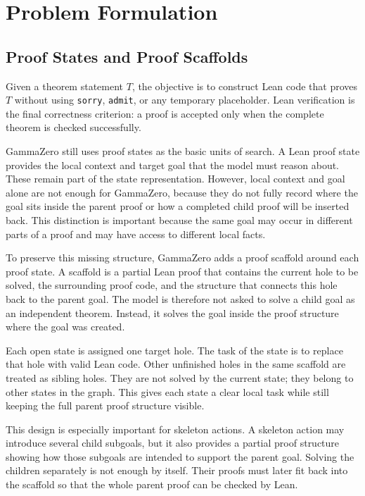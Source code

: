 \chapter{Problem Formulation}
\label{sec:problem-formulation}

\section{Proof States and Proof Scaffolds}

Given a theorem statement \(T\), the objective is to construct Lean code that proves \(T\) without using \texttt{sorry}, \texttt{admit}, or any temporary placeholder. Lean verification is the final correctness criterion: a proof is accepted only when the complete theorem is checked successfully.

GammaZero still uses proof states as the basic units of search. A Lean proof state provides the local context and target goal that the model must reason about. These remain part of the state representation. However, local context and goal alone are not enough for GammaZero, because they do not fully record where the goal sits inside the parent proof or how a completed child proof will be inserted back. This distinction is important because the same goal may occur in different parts of a proof and may have access to different local facts.

To preserve this missing structure, GammaZero adds a proof scaffold around each proof state. A scaffold is a partial Lean proof that contains the current hole to be solved, the surrounding proof code, and the structure that connects this hole back to the parent goal. The model is therefore not asked to solve a child goal as an independent theorem. Instead, it solves the goal inside the proof structure where the goal was created.

Each open state is assigned one target hole. The task of the state is to replace that hole with valid Lean code. Other unfinished holes in the same scaffold are treated as sibling holes. They are not solved by the current state; they belong to other states in the graph. This gives each state a clear local task while still keeping the full parent proof structure visible.

This design is especially important for skeleton actions. A skeleton action may introduce several child subgoals, but it also provides a partial proof structure showing how those subgoals are intended to support the parent goal. Solving the children separately is not enough by itself. Their proofs must later fit back into the scaffold so that the whole parent proof can be checked by Lean.

